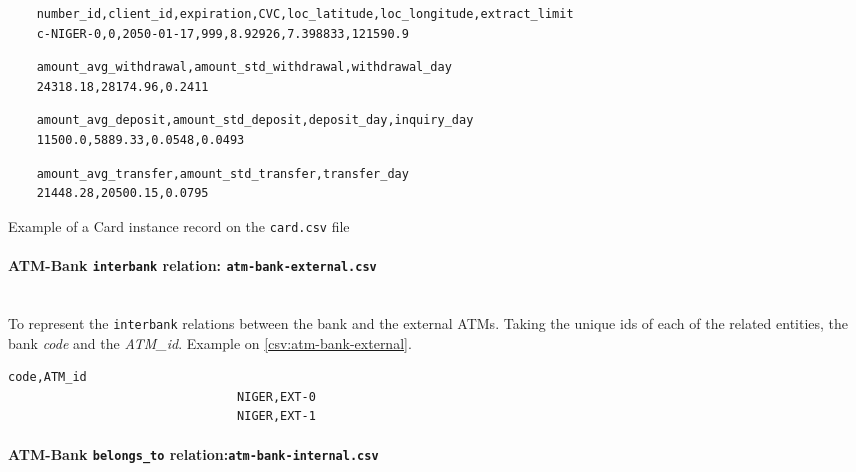 \begin{table}[h]
    \centering
    \lstset{style=csvStyle}
    
    \begin{lstlisting}
    number_id,client_id,expiration,CVC,loc_latitude,loc_longitude,extract_limit
    c-NIGER-0,0,2050-01-17,999,8.92926,7.398833,121590.9
    \end{lstlisting}

    \begin{lstlisting}
    amount_avg_withdrawal,amount_std_withdrawal,withdrawal_day
    24318.18,28174.96,0.2411
    \end{lstlisting}

    \begin{lstlisting}
    amount_avg_deposit,amount_std_deposit,deposit_day,inquiry_day
    11500.0,5889.33,0.0548,0.0493
    \end{lstlisting}

    \begin{lstlisting}
    amount_avg_transfer,amount_std_transfer,transfer_day
    21448.28,20500.15,0.0795
    \end{lstlisting}

    \caption{Example of a Card instance record on the \texttt{card.csv} file}
    \label{table:csv-card-example}
\end{table}


\paragraph{ATM-Bank \texttt{interbank} relation: \texttt{atm-bank-external.csv}\\\\}

To represent the \texttt{interbank} relations between the bank and the external ATMs. Taking the unique ids of each of the related entities, the bank \emph{code} and the \emph{ATM\_id}. Example on \ref{csv:atm-bank-external}.

\begin{center}
\lstset{style=csvStyle}
\begin{lstlisting}[caption={Example of a atm-bank-external.csv}, label={csv:atm-bank-external}]
                                code,ATM_id
                                NIGER,EXT-0
                                NIGER,EXT-1
\end{lstlisting}
\end{center}

\paragraph{ATM-Bank \texttt{belongs\_to} relation:\texttt{atm-bank-internal.csv}\\\\}

